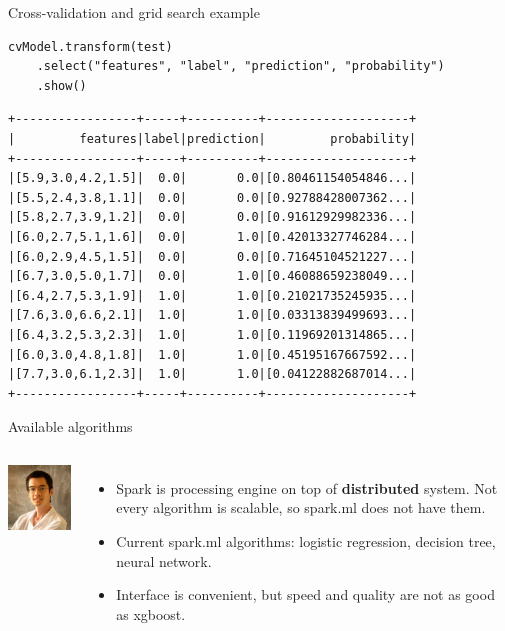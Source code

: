 \documentclass[unicode, notheorems]{beamer}
\begin{document}
\begin{frame}[fragile]{Cross-validation and grid search example}

{\footnotesize
\begin{verbatim}
cvModel.transform(test)
    .select("features", "label", "prediction", "probability")
    .show()
\end{verbatim}

\begin{verbatim}
+-----------------+-----+----------+--------------------+
|         features|label|prediction|         probability|
+-----------------+-----+----------+--------------------+
|[5.9,3.0,4.2,1.5]|  0.0|       0.0|[0.80461154054846...|
|[5.5,2.4,3.8,1.1]|  0.0|       0.0|[0.92788428007362...|
|[5.8,2.7,3.9,1.2]|  0.0|       0.0|[0.91612929982336...|
|[6.0,2.7,5.1,1.6]|  0.0|       1.0|[0.42013327746284...|
|[6.0,2.9,4.5,1.5]|  0.0|       0.0|[0.71645104521227...|
|[6.7,3.0,5.0,1.7]|  0.0|       1.0|[0.46088659238049...|
|[6.4,2.7,5.3,1.9]|  1.0|       1.0|[0.21021735245935...|
|[7.6,3.0,6.6,2.1]|  1.0|       1.0|[0.03313839499693...|
|[6.4,3.2,5.3,2.3]|  1.0|       1.0|[0.11969201314865...|
|[6.0,3.0,4.8,1.8]|  1.0|       1.0|[0.45195167667592...|
|[7.7,3.0,6.1,2.3]|  1.0|       1.0|[0.04122882687014...|
+-----------------+-----+----------+--------------------+
\end{verbatim}
}
\end{frame}

\begin{frame}{Available algorithms}
\begin{columns}
\begin{center}
	\includegraphics[width=3.2cm]{images/scientist}
\end{center}

\begin{itemize}
\item Spark is processing engine on top of \textbf{distributed} system. Not every algorithm is scalable, so spark.ml does not have them.
\item Current spark.ml algorithms: logistic regression, decision tree, neural network.
\item Interface is convenient, but speed and quality are not as good as xgboost.
\end{itemize}
\end{columns}
\end{frame}
\end{document}
